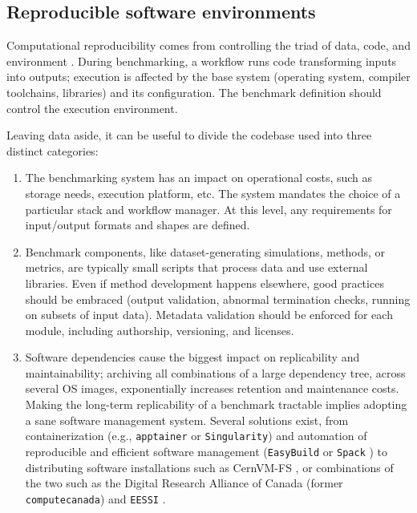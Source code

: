 \documentclass[11pt]{article}
\begin{document}
\subsection*{Reproducible software environments \label{softwareenvs}}

Computational reproducibility comes from controlling the triad of data, code, and environment \cite{Hill2024-gf}. During benchmarking, a workflow runs code transforming inputs into outputs; execution is affected by the base system (operating system, compiler toolchains, libraries) and its configuration. The benchmark definition should control the execution environment.

Leaving data aside, it can be useful to divide the codebase used into three distinct categories:

\begin{enumerate}
\item The benchmarking system has an impact on operational costs, such as storage needs, execution platform, etc.  The system mandates the choice of a particular stack and workflow manager. At this level, any requirements for input/output formats and shapes are defined.

\item Benchmark components, like dataset-generating simulations, methods, or metrics, are typically small scripts that process data and use external libraries. Even if method development happens elsewhere, good practices should be embraced (output validation, abnormal termination checks, running on subsets of input data).  Metadata validation should be enforced for each module, including authorship, versioning, and licenses.

\item Software dependencies cause the biggest impact on replicability and maintainability; archiving all combinations of a large dependency tree, across several OS images, exponentially increases retention and maintenance costs. Making the long-term replicability of a benchmark tractable implies adopting a sane software management system. Several solutions exist, from containerization (e.g., \texttt{apptainer} or \texttt{Singularity}) \cite{Kurtzer2017-mn} and automation of reproducible and efficient software management (\texttt{EasyBuild} \cite{Hoste2012-gg} or \texttt{Spack} \cite{Gamblin2015-ll}) to distributing software installations such as CernVM-FS \cite{Blomer2013-jk},  or combinations of the two such as the Digital Research Alliance of Canada (former \texttt{computecanada}) \cite{Boissonneault2019-wm} and \texttt{EESSI} \cite{droge2023-ax}.

\end{enumerate}
\end{document}
